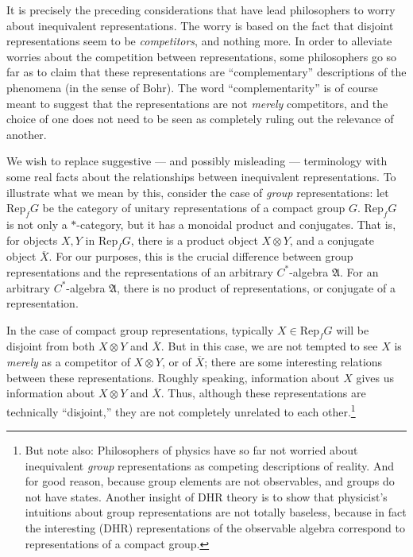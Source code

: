 \documentclass[12pt]{article}
\theoremstyle{definition}
\theoremstyle{definition}
\theoremstyle{remark}
\def\ol#1{{\overline #1}}
\def\al#1{{\mathfrak #1}}
\newcommand{\Rep}{\mathrm{Rep}}
\begin{document}
It is precisely the preceding considerations that have lead
philosophers to worry about inequivalent representations.  The worry
is based on the fact that disjoint representations seem to be
\emph{competitors}, and nothing more.  In order to alleviate worries
about the competition between representations, some philosophers
\cite{rindler,hans} go so far as to claim that these representations
are ``complementary'' descriptions of the phenomena (in the sense of
Bohr).  The word ``complementarity'' is of course meant to suggest
that the representations are not \emph{merely} competitors, and the
choice of one does not need to be seen as completely ruling out the
relevance of another.

We wish to replace suggestive --- and possibly misleading ---
terminology with some real facts about the relationships between
inequivalent representations.  To illustrate what we mean by this,
consider the case of \emph{group} representations: let $\Rep _fG$ be
the category of unitary representations of a compact group $G$.  $\Rep
_fG$ is not only a $*$-category, but it has a monoidal product and
conjugates.  That is, for objects $X,Y$ in $\Rep _fG$, there is a
product object $X\otimes Y$, and a conjugate object $\ol X$.  For our
purposes, this is the crucial difference between group representations
and the representations of an arbitrary $C^*$-algebra $\al A$.  For an
arbitrary $C^*$-algebra $\al A$, there is no product of
representations, or conjugate of a representation.  

In the case of compact group representations, typically $X\in \Rep
_fG$ will be disjoint from both $X\otimes Y$ and $\ol X$.  But in this
case, we are not tempted to see $X$ is \emph{merely} as a competitor
of $X\otimes Y$, or of $\ol X$; there are some interesting relations
between these representations.  Roughly speaking, information about
$X$ gives us information about $X\otimes Y$ and $\ol X$.  Thus,
although these representations are technically ``disjoint,'' they are
not completely unrelated to each other.\footnote{But note also:
  Philosophers of physics have so far not worried about inequivalent
  \emph{group} representations as competing descriptions of reality.
  And for good reason, because group elements are not observables, and
  groups do not have states.  Another insight of DHR theory is to show
  that physicist's intuitions about group representations are not
  totally baseless, because in fact the interesting (DHR)
  representations of the observable algebra correspond to
  representations of a compact group.}
\end{document}
